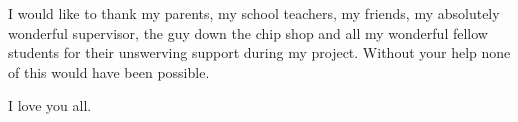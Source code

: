 I would like to thank my parents, my school teachers, my friends, my
absolutely wonderful supervisor, the guy down the chip shop and all
my wonderful fellow students for their unswerving support during my
project. Without your help none of this would have been possible.

I love you all.